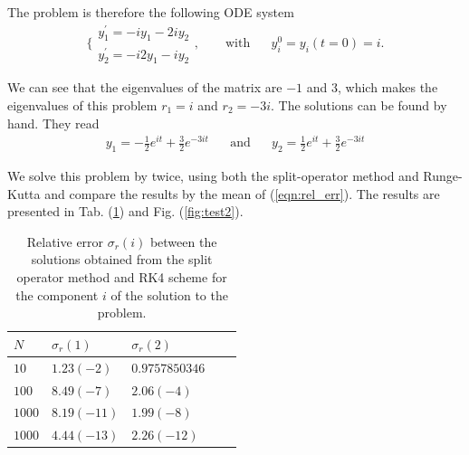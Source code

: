 \documentclass[10pt]{article}
\begin{document}
The problem is therefore the following ODE system
\begin{equation}
  \Bigg\lbrace
\begin{matrix}
 y_1^{\prime} = -i y_1 -2i y_2  \\
 y_2^{\prime} = -i 2y_1 - i y_2 
\end{matrix}, \hspace{20pt}\mbox{ with}\hspace{20pt} y_{i}^0 = y_i(t=0) = i.
\label{eqn:test2}
\end{equation}

We can see that the eigenvalues of the matrix are $-1$ and
$3$, which makes the eigenvalues of this problem 
$r_1 = i$ and $r_2 = -3i$.
The solutions can be found by hand. They read
\begin{align}
 y_1 = -\frac{1}{2}e^{it} + \frac{3}{2}e^{-3it}\hspace{20pt}\mbox{and} 
 \hspace{20pt} 
 y_2 = \frac{1}{2}e^{it} + \frac{3}{2}e^{-3it} \label{eqn:test2}
\end{align}

We solve this problem by twice, using both the split-operator method and
Runge-Kutta and compare the results by the mean of (\ref{eqn:rel_err}).
The results are presented in Tab. (\ref{tab:test2}) and Fig. (\ref{fig:test2}).

%  

\begin{table}[!ht]
   \centering\small
    \begin{tabular}{|l|l|l|l|l|}
    \hline
    $N$      & $\sigma_r(1)$  & $\sigma_r(2)$     \\ \hline
    $10$     & $1.23(-2)$     & $0.9757850346$    \\ \hline
    $100$    & $8.49(-7)$     & $2.06(-4)$        \\ \hline
    $1000$   & $8.19(-11)$    & $1.99(-8)$        \\ \hline
    $1000$   & $4.44(-13)$    & $2.26(-12)$       \\ \hline
    \end{tabular}
    \caption{Relative error $\sigma_r(i)$
     between the solutions obtained from the
     split operator method and RK4 scheme for the component $i$ of the solution
to the problem.}
     \label{tab:test2}
\end{table}




\end{document}
